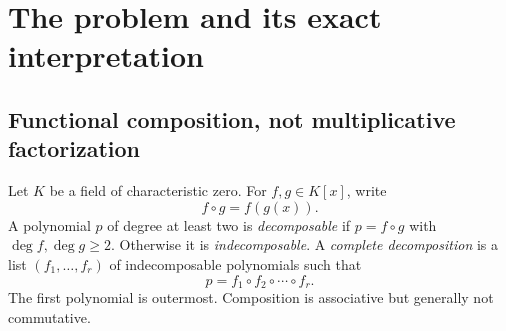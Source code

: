 \documentclass[11pt,a4paper]{article}
\theoremstyle{definition}
\newcommand{\code}[1]{\texttt{\detokenize{#1}}}
\begin{document}
\begin{abstract}
We develop an exact, factorization-free solution to functional decomposition of univariate polynomials whose coefficients are algebraic numbers, whether written as radicals, polynomial \code{Root} objects, or \code{AlgebraicNumber} objects. The elementary construction combines a normalized root at infinity with triangular recovery of an outer polynomial. Complete proofs establish uniqueness for a prescribed right degree, soundness and completeness of the decision procedure, descent to the coefficient field, termination of complete decomposition, and exhaustive enumeration modulo affine insertions. The theory is independent of algebraic-number notation and applies to any characteristic-zero field with effective arithmetic; the supplied package intentionally restricts input to recognized exact algebraic numbers.

The accompanying implementation uses coefficientwise \code{RootReduce}, dense coefficient arrays, a quadratic arithmetic-cost candidate test, and an independent recomposition routine. It distinguishes failure to validate input, a proved absence of a decomposition, and incomplete enumeration caused by an explicit output limit. Worked examples include the motivating radical sextic, its degree-24 composition, quintic algebraic coefficients, repeated derivative factors, Chebyshev collisions, and exact perturbations that defeat numerical zero tests. We also explain why the derivative-factor method is mathematically valid when implemented exhaustively, identify concrete defects in the supplied implementation, and separate arithmetic-operation bounds from the potentially substantial cost of exact number-field arithmetic. The underlying characteristic-zero ideas are classical; the contribution here is a self-contained derivation, a carefully specified implementation, and reproducible validation materials.
\end{abstract}
\begingroup
\small\setlength{\parskip}{0pt}
\tableofcontents
\endgroup
\newpage

\section{The problem and its exact interpretation}
\subsection{Functional composition, not multiplicative factorization}
Let $K$ be a field of characteristic zero. For $f,g\in K[x]$, write
\[
 f\circ g=f(g(x)).
\]
A polynomial $p$ of degree at least two is \emph{decomposable} if $p=f\circ g$ with $\deg f,\deg g\ge2$. Otherwise it is \emph{indecomposable}. A \emph{complete decomposition} is a list $(f_1,\ldots,f_r)$ of indecomposable polynomials such that
\[
 p=f_1\circ f_2\circ\cdots\circ f_r.
\]
The first polynomial is outermost. Composition is associative but generally not commutative.
\end{document}
